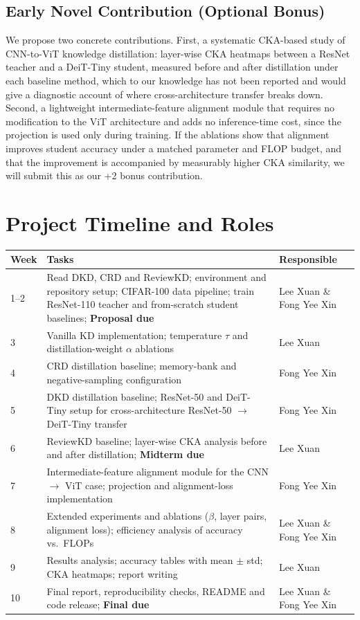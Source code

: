 \documentclass[11pt, letterpaper]{article}
\begin{document}
\subsection{Early Novel Contribution (Optional Bonus)}

We propose two concrete contributions. First, a systematic CKA-based study of
CNN-to-ViT knowledge distillation: layer-wise CKA heatmaps between a ResNet
teacher and a DeiT-Tiny student, measured before and after distillation under
each baseline method, which to our knowledge has not been reported and would
give a diagnostic account of where cross-architecture transfer breaks down.
Second, a lightweight intermediate-feature alignment module that requires no
modification to the ViT architecture and adds no inference-time cost, since the
projection is used only during training. If the ablations show that alignment
improves student accuracy under a matched parameter and FLOP budget, and that
the improvement is accompanied by measurably higher CKA similarity, we will
submit this as our +2 bonus contribution.

\section{Project Timeline and Roles}

\begin{center}
\begin{tabular}{lp{7cm}l}
\toprule
\textbf{Week} & \textbf{Tasks} & \textbf{Responsible} \\
\midrule
1--2 & Read DKD, CRD and ReviewKD; environment and repository setup; CIFAR-100 data pipeline; train ResNet-110 teacher and from-scratch student baselines; \textbf{Proposal due} & Lee Xuan \& Fong Yee Xin \\
3 & Vanilla KD implementation; temperature $\tau$ and distillation-weight $\alpha$ ablations & Lee Xuan \\
4 & CRD distillation baseline; memory-bank and negative-sampling configuration & Fong Yee Xin \\
5 & DKD distillation baseline; ResNet-50 and DeiT-Tiny setup for cross-architecture ResNet-50 $\rightarrow$ DeiT-Tiny transfer & Fong Yee Xin \\
6 & ReviewKD baseline; layer-wise CKA analysis before and after distillation; \textbf{Midterm due} & Lee Xuan \\
7 & Intermediate-feature alignment module for the CNN $\rightarrow$ ViT case; projection and alignment-loss implementation & Fong Yee Xin \\
8 & Extended experiments and ablations ($\beta$, layer pairs, alignment loss); efficiency analysis of accuracy vs.\ FLOPs & Lee Xuan \& Fong Yee Xin \\
9 & Results analysis; accuracy tables with mean $\pm$ std; CKA heatmaps; report writing & Lee Xuan \\
10 & Final report, reproducibility checks, README and code release; \textbf{Final due} & Lee Xuan \& Fong Yee Xin \\
\bottomrule
\end{tabular}
\end{center}
\end{document}
